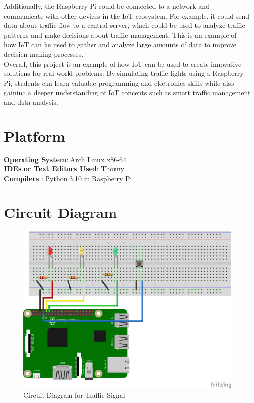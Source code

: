 \documentclass[11pt]{article}
\begin{document}
Additionally, the Raspberry Pi could be connected to a network and communicate with other devices in the IoT ecosystem. For example, it could send data about traffic flow to a central server, which could be used to analyze traffic patterns and make decisions about traffic management. This is an example of how IoT can be used to gather and analyze large amounts of data to improve decision-making processes.\\

Overall, this project is an example of how IoT can be used to create innovative solutions for real-world problems. By simulating traffic lights using a Raspberry Pi, students can learn valuable programming and electronics skills while also gaining a deeper understanding of IoT concepts such as smart traffic management and data analysis.\\

\section{Platform}
\textbf{Operating System}: Arch Linux x86-64 \\
\textbf{IDEs or Text Editors Used}: Thonny\\
\textbf{Compilers} : Python 3.10 in Raspberry Pi.

\section{Circuit Diagram}
\begin{figure}[H]
	\centering
	\includegraphics[width=.45\textwidth]{traffic-signal_bb.png}
	\caption{Circuit Diagram for Traffic Signal}
\end{figure}
\end{document}
